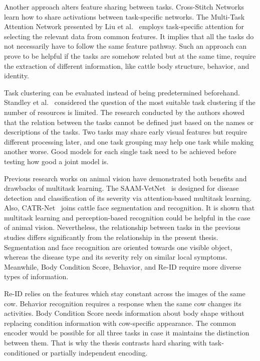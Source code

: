 Another approach alters feature sharing between tasks. Cross-Stitch Networks~\cite{misra2016crossstitch} learn how to share activations between task-specific networks. The Multi-Task Attention Network presented by Liu et al.~\cite{liu2019mtan} employs task-specific attention for selecting the relevant data from common features. It implies that all the tasks do not necessarily have to follow the same feature pathway. Such an approach can prove to be helpful if the tasks are somehow related but at the same time, require the extraction of different information, like cattle body structure, behavior, and identity.

Task clustering can be evaluated instead of being predetermined beforehand. Standley et al.~\cite{standley2020tasks} considered the question of the most suitable task clustering if the number of resources is limited. The research conducted by the authors showed that the relation between the tasks cannot be defined just based on the names or descriptions of the tasks. Two tasks may share early visual features but require different processing later, and one task grouping may help one task while making another worse. Good models for each single task need to be achieved before testing how good a joint model is.

Previous research works on animal vision have demonstrated both benefits and drawbacks of multitask learning. The SAAM-VetNet~\cite{attri2025saamvetnet} is designed for disease detection and classification of its severity via attention-based multitask learning. Also, CATR-Net~\cite{feng2025catr} joins cattle face segmentation and recognition. It is shown that multitask learning and perception-based recognition could be helpful in the case of animal vision. Nevertheless, the relationship between tasks in the previous studies differs significantly from the relationship in the present thesis. Segmentation and face recognition are oriented towards one visible object, whereas the disease type and its severity rely on similar local symptoms. Meanwhile, Body Condition Score, Behavior, and Re-ID require more diverse types of information.

Re-ID relies on the features which stay constant across the images of the same cow. Behavior recognition requires a response when the same cow changes its activities. Body Condition Score needs information about body shape without replacing condition information with cow-specific appearance. The common encoder would be possible for all three tasks in case it maintains the distinction between them. That is why the thesis contrasts hard sharing with task-conditioned or partially independent encoding.

